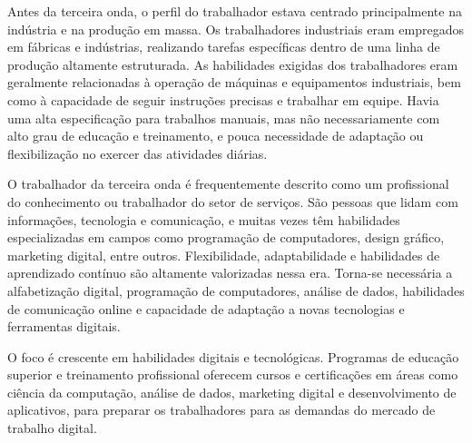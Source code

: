 Antes da terceira onda, o perfil do trabalhador estava centrado principalmente na indústria e na produção em massa. Os trabalhadores industriais eram empregados em fábricas e indústrias, realizando tarefas específicas dentro de uma linha de produção altamente estruturada. As habilidades exigidas dos trabalhadores eram geralmente relacionadas à operação de máquinas e equipamentos industriais, bem como à capacidade de seguir instruções precisas e trabalhar em equipe. Havia uma alta especificação para trabalhos manuais, mas não necessariamente com alto grau de educação e treinamento, e pouca necessidade de adaptação ou flexibilização no exercer das atividades diárias.

O trabalhador da terceira onda é frequentemente descrito como um profissional do conhecimento ou trabalhador do setor de serviços. São pessoas que lidam com informações, tecnologia e comunicação, e muitas vezes têm habilidades especializadas em campos como programação de computadores, design gráfico, marketing digital, entre outros. Flexibilidade, adaptabilidade e habilidades de aprendizado contínuo são altamente valorizadas nessa era. Torna-se necessária a alfabetização digital, programação de computadores, análise de dados, habilidades de comunicação online e capacidade de adaptação a novas tecnologias e ferramentas digitais.

O foco é crescente em habilidades digitais e tecnológicas. Programas de educação superior e treinamento profissional oferecem cursos e certificações em áreas como ciência da computação, análise de dados, marketing digital e desenvolvimento de aplicativos, para preparar os trabalhadores para as demandas do mercado de trabalho digital.

